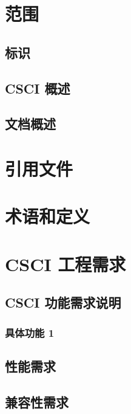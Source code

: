 \documentclass[a4paper]{scrreprt}
\begin{document}
\begin{CJK*}{UTF8}{song}

\makesrstitle

\clearpage
\frontmatter
\tableofcontents

\clearpage
\mainmatter

\begin{versionhistory}
\end{versionhistory}

\chapter{范围}
\section{标识}
\section{CSCI 概述}
\section{文档概述}

\chapter{引用文件}

\chapter{术语和定义}

\chapter{CSCI 工程需求}
\section{CSCI 功能需求说明}
\subsection{具体功能 1}
\section{性能需求}
\section{兼容性需求}

\end{CJK*}
\end{document}
